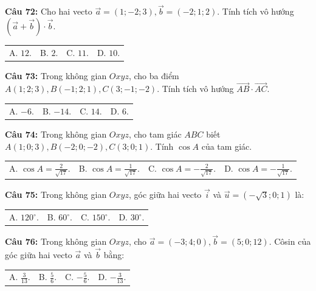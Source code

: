 \documentclass[12pt]{article}
\begin{document}
	\vspace{2mm}
	\noindent \textbf{Câu 72:} Cho hai vecto $\vec{a} = (1; -2; 3), \vec{b} = (-2; 1; 2)$. Tính tích vô hướng $(\vec{a} + \vec{b}) \cdot \vec{b}$. \\
	\noindent
	\begin{tabular}{p{} p{} p{} p{}}
		A. $12$. & B. $2$. & C. $11$. & D. $10$.
	\end{tabular}
	
	\vspace{2mm}
	\noindent \textbf{Câu 73:} Trong không gian $Oxyz$, cho ba điểm $A(1; 2; 3), B(-1; 2; 1), C(3; -1; -2)$. Tính tích vô hướng $\vec{AB} \cdot \vec{AC}$. \\
	\noindent
	\begin{tabular}{p{} p{} p{} p{}}
		A. $-6$. & B. $-14$. & C. $14$. & D. $6$.
	\end{tabular}
	
	\vspace{2mm}
	\noindent \textbf{Câu 74:} Trong không gian $Oxyz$, cho tam giác $ABC$ biết $A(1; 0; 3), B(-2; 0; -2), C(3; 0; 1)$. Tính $\cos A$ của tam giác. \\
	\noindent
	\begin{tabular}{p{} p{} p{} p{}}
		A. $\cos A = \frac{2}{\sqrt{17}}$. & B. $\cos A = \frac{1}{\sqrt{17}}$. & C. $\cos A = -\frac{2}{\sqrt{17}}$. & D. $\cos A = -\frac{1}{\sqrt{17}}$.
	\end{tabular}
	
	\vspace{2mm}
	\noindent \textbf{Câu 75:} Trong không gian $Oxyz$, góc giữa hai vecto $\vec{i}$ và $\vec{u} = (-\sqrt{3}; 0; 1)$ là: \\
	\noindent
	\begin{tabular}{p{} p{} p{} p{}}
		A. $120^\circ$. & B. $60^\circ$. & C. $150^\circ$. & D. $30^\circ$.
	\end{tabular}
	
	\vspace{2mm}
	\noindent \textbf{Câu 76:} Trong không gian $Oxyz$, cho $\vec{a} = (-3; 4; 0), \vec{b} = (5; 0; 12)$. Côsin của góc giữa hai vecto $\vec{a}$ và $\vec{b}$ bằng: \\
	\noindent
	\begin{tabular}{p{} p{} p{} p{}}
		A. $\frac{3}{13}$. & B. $\frac{5}{6}$. & C. $-\frac{5}{6}$. & D. $-\frac{3}{13}$.
	\end{tabular}
	
\end{document}
